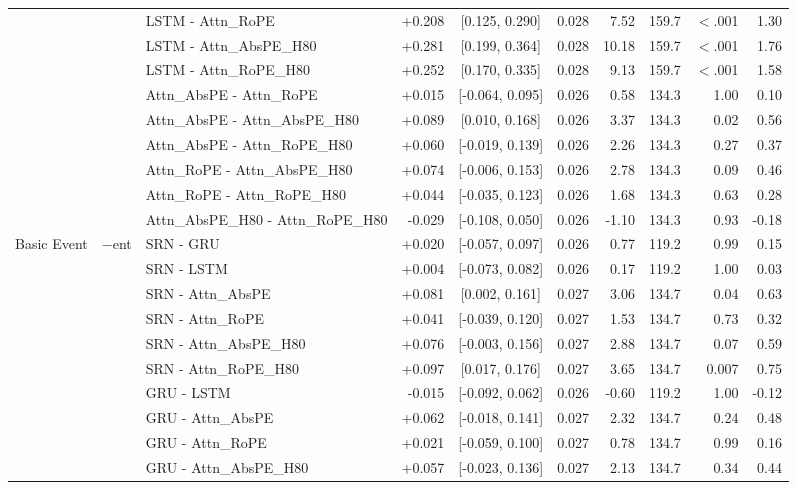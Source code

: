 \begin{longtable}{@{}lllrcrrrrr@{}}
 &  & LSTM - Attn\_RoPE & +0.208 & [0.125, 0.290] & 0.028 & 7.52 & 159.7 & $<$.001 & 1.30 \\
 &  & LSTM - Attn\_AbsPE\_H80 & +0.281 & [0.199, 0.364] & 0.028 & 10.18 & 159.7 & $<$.001 & 1.76 \\
 &  & LSTM - Attn\_RoPE\_H80 & +0.252 & [0.170, 0.335] & 0.028 & 9.13 & 159.7 & $<$.001 & 1.58 \\
 &  & Attn\_AbsPE - Attn\_RoPE & +0.015 & [-0.064, 0.095] & 0.026 & 0.58 & 134.3 & 1.00 & 0.10 \\
 &  & Attn\_AbsPE - Attn\_AbsPE\_H80 & +0.089 & [0.010, 0.168] & 0.026 & 3.37 & 134.3 & 0.02 & 0.56 \\
 &  & Attn\_AbsPE - Attn\_RoPE\_H80 & +0.060 & [-0.019, 0.139] & 0.026 & 2.26 & 134.3 & 0.27 & 0.37 \\
 &  & Attn\_RoPE - Attn\_AbsPE\_H80 & +0.074 & [-0.006, 0.153] & 0.026 & 2.78 & 134.3 & 0.09 & 0.46 \\
 &  & Attn\_RoPE - Attn\_RoPE\_H80 & +0.044 & [-0.035, 0.123] & 0.026 & 1.68 & 134.3 & 0.63 & 0.28 \\
 &  & Attn\_AbsPE\_H80 - Attn\_RoPE\_H80 & -0.029 & [-0.108, 0.050] & 0.026 & -1.10 & 134.3 & 0.93 & -0.18 \\
\addlinespace[2pt]
\addlinespace
Basic Event & $-$ent & SRN - GRU & +0.020 & [-0.057, 0.097] & 0.026 & 0.77 & 119.2 & 0.99 & 0.15 \\
 &  & SRN - LSTM & +0.004 & [-0.073, 0.082] & 0.026 & 0.17 & 119.2 & 1.00 & 0.03 \\
 &  & SRN - Attn\_AbsPE & +0.081 & [0.002, 0.161] & 0.027 & 3.06 & 134.7 & 0.04 & 0.63 \\
 &  & SRN - Attn\_RoPE & +0.041 & [-0.039, 0.120] & 0.027 & 1.53 & 134.7 & 0.73 & 0.32 \\
 &  & SRN - Attn\_AbsPE\_H80 & +0.076 & [-0.003, 0.156] & 0.027 & 2.88 & 134.7 & 0.07 & 0.59 \\
 &  & SRN - Attn\_RoPE\_H80 & +0.097 & [0.017, 0.176] & 0.027 & 3.65 & 134.7 & 0.007 & 0.75 \\
 &  & GRU - LSTM & -0.015 & [-0.092, 0.062] & 0.026 & -0.60 & 119.2 & 1.00 & -0.12 \\
 &  & GRU - Attn\_AbsPE & +0.062 & [-0.018, 0.141] & 0.027 & 2.32 & 134.7 & 0.24 & 0.48 \\
 &  & GRU - Attn\_RoPE & +0.021 & [-0.059, 0.100] & 0.027 & 0.78 & 134.7 & 0.99 & 0.16 \\
 &  & GRU - Attn\_AbsPE\_H80 & +0.057 & [-0.023, 0.136] & 0.027 & 2.13 & 134.7 & 0.34 & 0.44 \\

\end{longtable}
